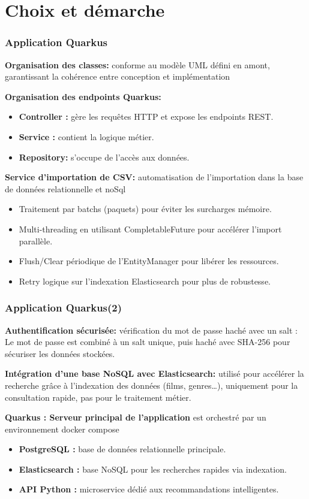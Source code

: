 \documentclass{beamer}
\begin{document}
\section{Choix et démarche}
\begin{frame}
    \scriptsize
    \frametitle{Application Quarkus}
    \textbf{Organisation des classes: }conforme au modèle UML défini en amont, garantissant la cohérence entre conception et implémentation


    \textbf{Organisation des endpoints Quarkus:}
    \begin{itemize}
        \item \textbf{Controller :}  gère les requêtes HTTP et expose les endpoints REST.
        \item \textbf{Service : }contient la logique métier.
        \item \textbf{Repository: } s'occupe de l'accès aux données.
    \end{itemize}

    \textbf{Service d'importation de CSV: }automatisation de l'importation dans la base de données relationnelle et noSql
    \begin{itemize}
        \item Traitement par batchs (paquets) pour éviter les surcharges mémoire.
        \item Multi-threading en utilisant CompletableFuture pour accélérer l'import parallèle.
        \item Flush/Clear périodique de l’EntityManager pour libérer les ressources.
        \item Retry logique sur l’indexation Elasticsearch pour plus de robustesse.
    \end{itemize}
\end{frame}

\begin{frame}
    \scriptsize
    \frametitle{Application Quarkus(2)}
    \textbf{Authentification sécurisée: }vérification du mot de passe haché avec un salt : Le mot de passe est combiné à un salt unique, puis haché avec SHA-256 pour sécuriser les données stockées.

    \textbf{Intégration d’une base NoSQL avec Elasticsearch: } utilisé pour accélérer la recherche grâce à l’indexation des données (films, genres…), uniquement pour la consultation rapide, pas pour le traitement métier.

    \textbf{Quarkus : Serveur principal de l’application} est orchestré par un environnement docker compose
    \begin{itemize}
        \item \textbf{PostgreSQL :} base de données relationnelle principale.
        \item \textbf{Elasticsearch :} base NoSQL pour les recherches rapides via indexation.
        \item \textbf{API Python :} microservice dédié aux recommandations intelligentes.


    \end{itemize}



\end{frame}
\end{document}
